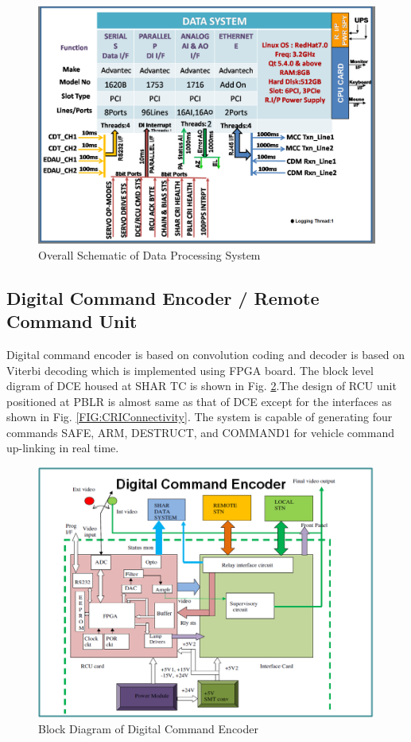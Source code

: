 \begin{figure}[H]
	\centering
	\includegraphics[width=\linewidth]{./Diagrams/DPSBlockDiagram.png}
	\caption{Overall Schematic of Data Processing System }
	\label{FIG:DPSSchematic}
\end{figure}


\subsection{Digital Command Encoder / Remote Command Unit }
Digital command encoder is based on convolution coding and decoder is based on Viterbi decoding which is implemented using FPGA board. The block level digram of DCE housed at SHAR TC is shown in Fig. \ref{FIG:DCEDiag}.The design of RCU unit positioned at PBLR is almost same as that of DCE except for the interfaces as shown in Fig. \ref{FIG:CRIConnectivity}. The system is capable of generating four commands SAFE, ARM, DESTRUCT, and COMMAND1 for vehicle command up-linking in real time.

\begin{figure}[H]
	\centering
	\includegraphics[width=\linewidth]{./Diagrams/DCEBlockDiag.png}
	\caption{Block Diagram of Digital Command Encoder }
	\label{FIG:DCEDiag}
\end{figure}

